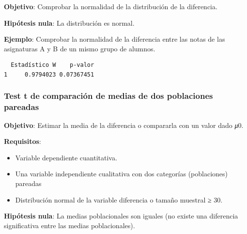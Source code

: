 \documentclass[
  a4paper,
]{scrreport}
\newenvironment{Shaded}{\begin{snugshade}}{\end{snugshade}}
\newcommand{\AttributeTok}[1]{\textcolor[rgb]{0.40,0.45,0.13}{#1}}
\newcommand{\FunctionTok}[1]{\textcolor[rgb]{0.28,0.35,0.67}{#1}}
\newcommand{\NormalTok}[1]{\textcolor[rgb]{0.00,0.23,0.31}{#1}}
\newcommand{\OtherTok}[1]{\textcolor[rgb]{0.00,0.23,0.31}{#1}}
\newcommand{\SpecialCharTok}[1]{\textcolor[rgb]{0.37,0.37,0.37}{#1}}
\newcommand{\StringTok}[1]{\textcolor[rgb]{0.13,0.47,0.30}{#1}}
\providecommand{\tightlist}{%
  \setlength{\itemsep}{0pt}\setlength{\parskip}{0pt}}\usepackage{longtable,booktabs,array}
\theoremstyle{definition}
\theoremstyle{definition}
\theoremstyle{remark}
\begin{document}
\textbf{Objetivo}: Comprobar la normalidad de la distribución de la
diferencia.

\textbf{Hipótesis nula}: La distribución es normal.

\textbf{Ejemplo}: Comprobar la normalidad de la diferencia entre las
notas de las asignaturas A y B de un mismo grupo de alumnos.

\begin{Shaded}
\end{Shaded}

\begin{verbatim}
  Estadístico W    p-valor
1     0.9794023 0.07367451
\end{verbatim}

\hypertarget{test-t-de-comparaciuxf3n-de-medias-de-dos-poblaciones-pareadas}{%
\subsubsection{Test t de comparación de medias de dos poblaciones
pareadas}\label{test-t-de-comparaciuxf3n-de-medias-de-dos-poblaciones-pareadas}}

\textbf{Objetivo}: Estimar la media de la diferencia o compararla con un
valor dado \emph{μ}0.

\textbf{Requisitos}:

\begin{itemize}
\tightlist
\item
  Variable dependiente cuantitativa.
\item
  Una variable independiente cualitativa con dos categorías
  (poblaciones) pareadas
\item
  Distribución normal de la variable diferencia o tamaño muestral ≥ 30.
\end{itemize}

\textbf{Hipótesis nula}: La medias poblacionales son iguales (no existe
una diferencia significativa entre las medias poblacionales).
\end{document}

